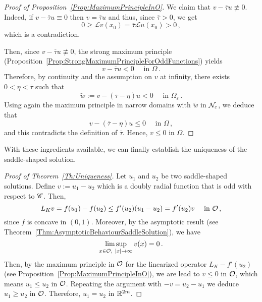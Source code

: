 \begin{proof}[Proof of Proposition~\ref{Prop:MaximumPrincipleInO}]
	We claim that $v - \overline{\tau} u \not \equiv 0$. Indeed, if $v - \overline{\tau} u \equiv 0$ then $v = \overline{\tau} u$ and thus, since $\overline{\tau} > 0$, we get
	$$
	0 \geq \mathscr{L} v(x_0) = \overline{\tau} \mathscr{L} u(x_0) > 0\,, 
	$$
	which is a contradiction.
	
	Then, since $v - \overline{\tau} u \not \equiv 0$, the strong maximum principle (Proposition~\ref{Prop:StrongMaximumPrincipleForOddFunctions}) yields
	$$
	v - \overline{\tau} u < 0 \quad \textrm{ in }\Omega\,.
	$$
	Therefore, by continuity and the assumption on $v$ at infinity, there exists $0 < \eta <\overline{\tau}$ such that 
	$$
	\tilde{w} := v - (\overline{\tau} - \eta) u < 0 \quad \textrm{ in }\overline{\Omega}_\varepsilon\,.
	$$
	Using again the maximum principle in narrow domains with $\tilde{w}$ in $\mathcal{N}_\varepsilon$, we deduce that 
	$$
	v - (\overline{\tau} - \eta) u \leq 0 \quad \textrm{ in }\Omega\,,
	$$
	and this contradicts the definition of $\overline{\tau}$. Hence, $v\leq 0$ in $\Omega$.
\end{proof}



With these ingredients available, we can finally establish the uniqueness of the saddle-shaped solution.



\begin{proof}[Proof of Theorem~\ref{Th:Uniqueness}]
	Let $u_1$ and $u_2$ be two saddle-shaped solutions. Define $v := u_1 - u_2$ which is a doubly radial function that is odd with respect to $\mathscr{C}$. Then,
	$$
	L_K v = f(u_1) - f(u_2) \leq f'(u_2) (u_1 - u_2) = f'(u_2) v \quad \textrm{ in } \mathcal{O}\,,
	$$
	since $f$ is concave in $(0,1)$. Moreover, by the asymptotic result (see Theorem~\ref{Thm:AsymptoticBehaviourSaddleSolution}), we have
	$$
	\limsup_{x\in \mathcal{O}, \ |x|\to \infty} v(x) = 0\,.
	$$
	Then, by the maximum principle in $\mathcal{O}$ for the linearized operator $L_K  - f'(u_2)$ (see Proposition~\ref{Prop:MaximumPrincipleInO}), we are lead to $v \leq 0$ in $\mathcal{O}$, which means $u_1 \leq u_2$ in $\mathcal{O}$. Repeating the  argument with $-v = u_2 - u_1$ we deduce $u_1 \geq u_2$ in $\mathcal{O}$. Therefore, $u_1 = u_2$ in $\mathbb{R}^{2m}$.
\end{proof}


